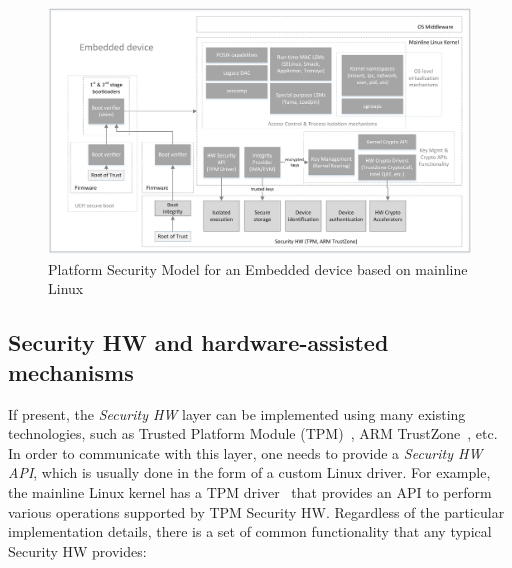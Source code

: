 \begin{figure}[t]
	\centering
		\includegraphics[width=1\textwidth]{figures/LinuxKernelPlatSecModel.png}
	\caption{Platform Security Model for an Embedded device based on mainline Linux}
	\label{fig:platsec}
\end{figure}

\subsection{Security HW and hardware-assisted mechanisms}

If present, the \textit{Security HW} layer can be implemented using many existing technologies, such as Trusted Platform Module (TPM)~\cite{tpm}, ARM TrustZone~\cite{trustzone}, etc. In order to communicate with this layer, one needs to provide a \textit{Security HW API}, which is usually done in the form of a custom Linux driver. For example, the mainline Linux kernel has a TPM driver~\cite{tpmdriver} that provides an API to perform various operations supported by TPM Security HW. Regardless of the particular implementation details, there is a set of common functionality that any typical Security HW provides:

